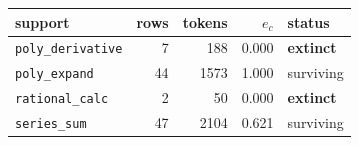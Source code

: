 \begin{tabular}{lrrrl}
\toprule
support & rows & tokens & $e_c$ & status \\
\midrule
\texttt{poly\_derivative} & 7 & 188 & 0.000 & \textbf{extinct} \\
\texttt{poly\_expand} & 44 & 1573 & 1.000 & surviving \\
\texttt{rational\_calc} & 2 & 50 & 0.000 & \textbf{extinct} \\
\texttt{series\_sum} & 47 & 2104 & 0.621 & surviving \\
\bottomrule
\end{tabular}
